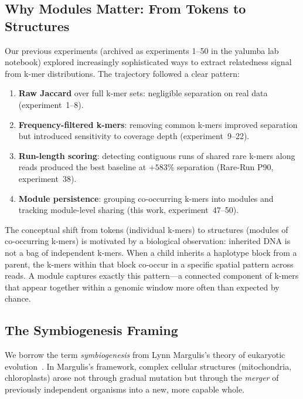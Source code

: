 \documentclass{../yalumba}
\begin{document}
\subsection{Why Modules Matter: From Tokens to Structures}

Our previous experiments (archived as experiments 1--50 in the yalumba lab
notebook) explored increasingly sophisticated ways to extract relatedness signal
from k-mer distributions.  The trajectory followed a clear pattern:

\begin{enumerate}
  \item \textbf{Raw Jaccard} over full k-mer sets: negligible separation on
        real data (experiment~1--8).
  \item \textbf{Frequency-filtered k-mers}: removing common k-mers improved
        separation but introduced sensitivity to coverage depth (experiment~9--22).
  \item \textbf{Run-length scoring}: detecting contiguous runs of shared rare
        k-mers along reads produced the best baseline at $+583\%$ separation
        (Rare-Run P90, experiment~38).
  \item \textbf{Module persistence}: grouping co-occurring k-mers into modules
        and tracking module-level sharing (this work, experiment~47--50).
\end{enumerate}

The conceptual shift from tokens (individual k-mers) to structures (modules of
co-occurring k-mers) is motivated by a biological observation: inherited DNA is
not a bag of independent k-mers.  When a child inherits a haplotype block from
a parent, the k-mers within that block co-occur in a specific spatial pattern
across reads.  A module captures exactly this pattern---a connected component of
k-mers that appear together within a genomic window more often than expected by
chance.

\subsection{The Symbiogenesis Framing}


We borrow the term \emph{symbiogenesis} from Lynn Margulis's theory of
eukaryotic evolution~\cite{margulis1998}.  In Margulis's framework, complex
cellular structures (mitochondria, chloroplasts) arose not through gradual
mutation but through the \emph{merger} of previously independent organisms into
a new, more capable whole.
\end{document}
